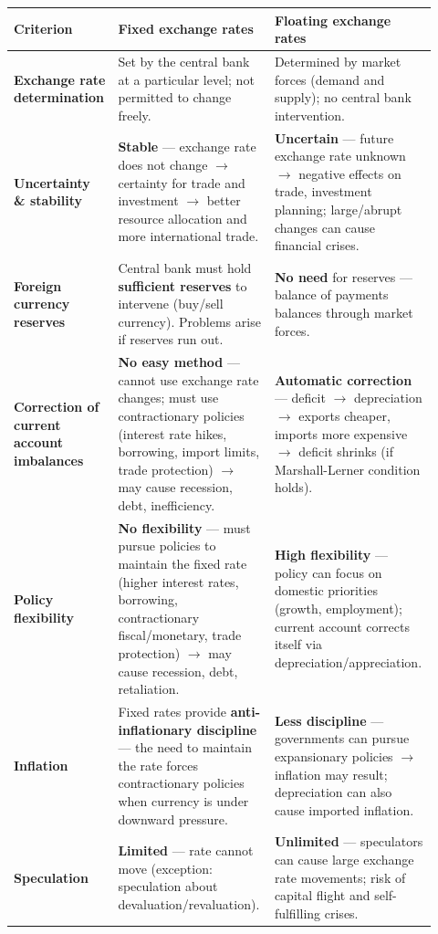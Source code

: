 \documentclass[a4paper,12pt]{article}
\begin{document}
\begin{center}
\renewcommand{\arraystretch}{1.4}
\footnotesize
\begin{tabular}{p{0.2\linewidth}|p{0.36\linewidth}|p{0.36\linewidth}}
\toprule
\textbf{Criterion} & \textbf{Fixed exchange rates} & \textbf{Floating exchange rates} \\
\midrule
\textbf{Exchange rate determination} & Set by the central bank at a particular level; not permitted to change freely. & Determined by market forces (demand and supply); no central bank intervention. \\
\textbf{Uncertainty \& stability} & \textbf{Stable} --- exchange rate does not change $\to$ certainty for trade and investment $\to$ better resource allocation and more international trade. & \textbf{Uncertain} --- future exchange rate unknown $\to$ negative effects on trade, investment planning; large/abrupt changes can cause financial crises. \\
\textbf{Foreign currency reserves} & Central bank must hold \textbf{sufficient reserves} to intervene (buy/sell currency). Problems arise if reserves run out. & \textbf{No need} for reserves --- balance of payments balances through market forces. \\
\textbf{Correction of current account imbalances} & \textbf{No easy method} --- cannot use exchange rate changes; must use contractionary policies (interest rate hikes, borrowing, import limits, trade protection) $\to$ may cause recession, debt, inefficiency. & \textbf{Automatic correction} --- deficit $\to$ depreciation $\to$ exports cheaper, imports more expensive $\to$ deficit shrinks (if Marshall-Lerner condition holds). \\
\textbf{Policy flexibility} & \textbf{No flexibility} --- must pursue policies to maintain the fixed rate (higher interest rates, borrowing, contractionary fiscal/monetary, trade protection) $\to$ may cause recession, debt, retaliation. & \textbf{High flexibility} --- policy can focus on domestic priorities (growth, employment); current account corrects itself via depreciation/appreciation. \\
\textbf{Inflation} & Fixed rates provide \textbf{anti-inflationary discipline} --- the need to maintain the rate forces contractionary policies when currency is under downward pressure. & \textbf{Less discipline} --- governments can pursue expansionary policies $\to$ inflation may result; depreciation can also cause imported inflation. \\
\textbf{Speculation} & \textbf{Limited} --- rate cannot move (exception: speculation about devaluation/revaluation). & \textbf{Unlimited} --- speculators can cause large exchange rate movements; risk of capital flight and self-fulfilling crises. \\

\end{tabular}
\end{center}
\end{document}
